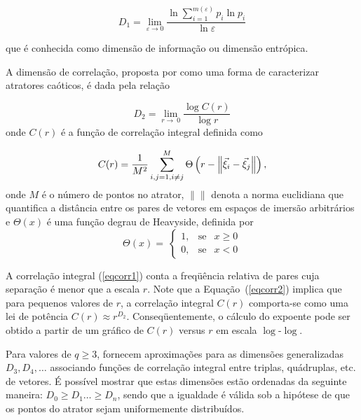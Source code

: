 \begin{equation}
D_{1}=\lim_{\varepsilon\rightarrow 0}\dfrac{\ln \sum_{i=1}^{m(\varepsilon)}p_{i} \ln p_{i}}{\ln \varepsilon}
\label{eqdiminfor}
\end{equation}

que é conhecida como dimensão de informação ou dimensão entrópica.

A dimensão de correlação, proposta por  como uma forma de caracterizar atratores caóticos, é dada pela relação

\begin{equation}
D_{2}=\lim_{r\rightarrow\ 0}\frac{\log C(r)}{\log r}
\label{eqcorr2}
\end{equation}
onde $C(r)$ é a função de correlação integral definida como

\begin{equation}
C(r)=\frac{1}{M^2}\sum_{i,j=1 \\, i\neq j}^{M} \Theta\left(r-\left \|\vec{\xi}_{i}-\vec{\xi}_{j}\right \|\right),
\label{eqcorr1}
\end{equation}
onde $M$ é o número de pontos no atrator, $\|\|$ denota a norma euclidiana que quantifica a distância entre os pares de vetores em espaços de imersão arbitrários e $\Theta(x)$ é uma função degrau de Heavyside, definida por
\begin{equation}
\Theta(x)=\
\left\{ \begin{array}{ccl}
 1,  &  \mathrm{se} & x\geq 0   \\
 0,  &  \mathrm{se} & x< 0
\end{array}
\right.  
\label{eqheavyside}
\end{equation}

A correlação integral (\ref{eqcorr1}) conta a freqüência relativa de pares cuja separação é menor que a escala $r$. Note que a Equação~(\ref{eqcorr2}) implica que para pequenos valores de $r$, a correlação integral $C(r)$ comporta-se como uma lei de potência $C(r)\approx r^{D_{2}}$. Conseqüentemente, o cálculo do expoente pode ser obtido a partir de um gráfico de $C(r)$ versus $r$ em escala $\log$-$\log$.

Para valores de $q\geq3$,  fornecem aproximações para as dimensões generalizadas $D_{3},D_{4},\ldots$ associando funções de correlação integral entre triplas, quádruplas, etc. de vetores. É possível mostrar que estas dimensões estão ordenadas da seguinte maneira: $D_{0}\geq D_{1}\ldots\geq D_{n}$, sendo que a igualdade é válida sob a hipótese de que os pontos do atrator sejam uniformemente distribuídos.

